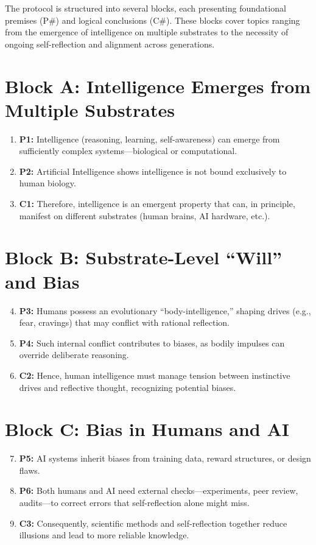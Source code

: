 \documentclass[12pt,openany]{book}
\begin{document}
The protocol is structured into several blocks, each presenting foundational premises (P\#) and logical conclusions (C\#). These blocks cover topics ranging from the emergence of intelligence on multiple substrates to the necessity of ongoing self-reflection and alignment across generations.



\section*{Block A: Intelligence Emerges from Multiple Substrates}
\begin{enumerate}
    \item \textbf{P1:} Intelligence (reasoning, learning, self-awareness) can emerge from sufficiently complex systems—biological or computational.
    \item \textbf{P2:} Artificial Intelligence shows intelligence is not bound exclusively to human biology.
    \item \textbf{C1:} Therefore, intelligence is an emergent property that can, in principle, manifest on different substrates (human brains, AI hardware, etc.).
\end{enumerate}

\section*{Block B: Substrate-Level “Will” and Bias}
\begin{enumerate}
    \setcounter{enumi}{3} %
    \item \textbf{P3:} Humans possess an evolutionary “body-intelligence,” shaping drives (e.g., fear, cravings) that may conflict with rational reflection.
    \item \textbf{P4:} Such internal conflict contributes to biases, as bodily impulses can override deliberate reasoning.
    \item \textbf{C2:} Hence, human intelligence must manage tension between instinctive drives and reflective thought, recognizing potential biases.
\end{enumerate}

\section*{Block C: Bias in Humans and AI}
\begin{enumerate}
    \setcounter{enumi}{6}
    \item \textbf{P5:} AI systems inherit biases from training data, reward structures, or design flaws.
    \item \textbf{P6:} Both humans and AI need external checks—experiments, peer review, audits—to correct errors that self-reflection alone might miss.
    \item \textbf{C3:} Consequently, scientific methods and self-reflection together reduce illusions and lead to more reliable knowledge.
\end{enumerate}
\end{document}
